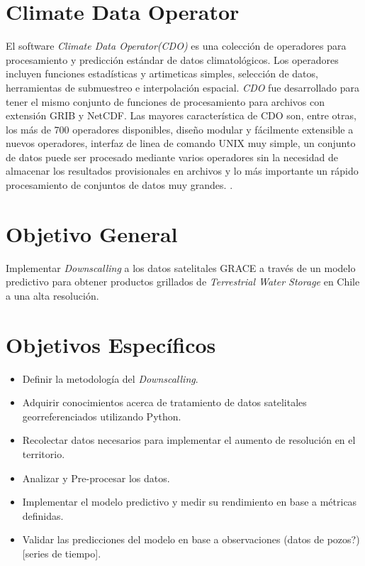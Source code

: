 \section{Climate Data Operator}
El software \textit{Climate Data Operator(CDO)} es una colección de operadores para procesamiento y predicción estándar de datos climatológicos.
Los operadores incluyen funciones estadísticas y artimeticas simples, selección de datos, herramientas de submuestreo e interpolación espacial.
\textit{CDO} fue desarrollado para tener el mismo conjunto de funciones de procesamiento para archivos con extensión GRIB y NetCDF. Las mayores característica
de CDO son, entre otras, los más de 700 operadores disponibles, diseño modular y fácilmente extensible a nuevos operadores, interfaz de linea de comando UNIX muy simple,
un conjunto de datos puede ser procesado mediante varios operadores sin la necesidad de almacenar los resultados provisionales en archivos y lo más importante un rápido procesamiento
de conjuntos de datos muy grandes. \cite{16}.
%
%
%
%
\section{Objetivo General}

Implementar \textit{Downscalling} a los datos satelitales GRACE a través de un modelo predictivo para obtener 
productos grillados de \textit{Terrestrial Water Storage} en Chile a una alta resolución.
%
%
%
%
\section{Objetivos Específicos}
\begin{itemize}
    \item Definir la metodología del \textit{Downscalling}.
    \item Adquirir conocimientos acerca de tratamiento de datos satelitales georreferenciados utilizando Python.
    \item Recolectar datos necesarios para implementar el aumento de resolución en el territorio.
    \item Analizar y Pre-procesar los datos. 
    \item Implementar el modelo predictivo y medir su rendimiento en base a métricas definidas.
    \item Validar las predicciones del modelo en base a observaciones (datos de pozos?) [series de tiempo].
\end{itemize}